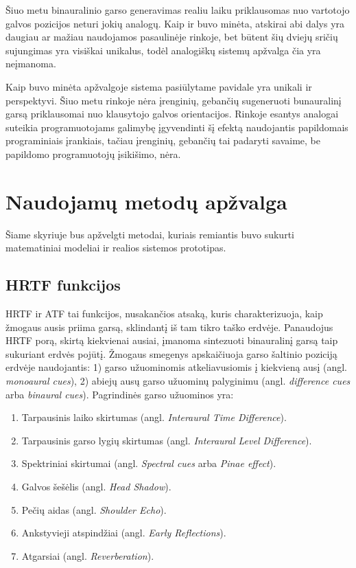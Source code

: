 \documentclass[]{vgtuef}
\begin{document}
Šiuo metu binauralinio garso generavimas realiu laiku priklausomas nuo vartotojo galvos pozicijos neturi jokių analogų. Kaip ir buvo minėta, atskirai abi dalys yra daugiau ar mažiau naudojamos pasaulinėje rinkoje, bet būtent šių dviejų sričių sujungimas yra visiškai unikalus, todėl analogiškų sistemų apžvalga čia yra neįmanoma.

Kaip buvo minėta apžvalgoje sistema pasiūlytame pavidale yra unikali ir perspektyvi. Šiuo metu rinkoje nėra įrenginių, gebančių sugeneruoti bunauralinį garsą priklausomai nuo klausytojo galvos orientacijos. Rinkoje esantys analogai suteikia programuotojams galimybę įgyvendinti šį efektą naudojantis papildomais programiniais įrankiais, tačiau įrenginių, gebančių tai padaryti savaime, be papildomo programuotojų įsikišimo, nėra.

\section{Naudojamų metodų apžvalga}
\label{sect:naudojami_metodai}

Šiame skyriuje bus apžvelgti metodai, kuriais remiantis buvo sukurti matematiniai modeliai ir realios sistemos prototipas.

\subsection{HRTF funkcijos}

HRTF ir ATF tai funkcijos, nusakančios atsaką, kuris charakterizuoja, kaip žmogaus ausis priima garsą, sklindantį iš tam tikro taško erdvėje. Panaudojus HRTF porą, skirtą kiekvienai ausiai, įmanoma sintezuoti binauralinį garsą taip sukuriant erdvės pojūtį.  
Žmogaus smegenys apskaičiuoja garso šaltinio poziciją erdvėje naudojantis: 1) garso užuominomis atkeliavusiomis į kiekvieną ausį (angl. \textit{monoaural cues}), 2) abiejų ausų garso užuominų palyginimu (angl. \textit{difference cues} arba \textit{binaural cues}). Pagrindinės garso užuominos yra:
\begin{enumerate}
\item Tarpausinis laiko skirtumas (angl. \textit{Interaural Time Difference}).
\item Tarpausinis garso lygių skirtumas (angl. \textit{Interaural Level Difference}).
\item Spektriniai skirtumai (angl. \textit{Spectral cues} arba \textit{Pinae effect}).
\item Galvos šešėlis (angl. \textit{Head Shadow}).
\item Pečių aidas (angl. \textit{Shoulder Echo}).
\item Ankstyvieji atspindžiai (angl. \textit{Early Reflections}).
\item Atgarsiai (angl. \textit{Reverberation}).
\end{enumerate}
\end{document}
